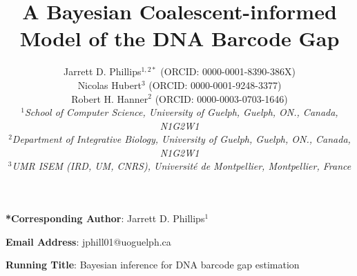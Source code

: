 \documentclass[12pt]{article}
\makeatletter
\renewcommand{\maketitle}{\bgroup\setlength{\parindent}{0pt}
\begin{flushleft}
\textbf{\@title}

  \@author
\end{flushleft}\egroup
}
\makeatother
\begin{document}
\linenumbers

\title{A Bayesian Coalescent-informed Model of the DNA Barcode Gap}

\author{Jarrett D. Phillips$^{1, 2*}$ (ORCID: 0000-0001-8390-386X) \\ Nicolas Hubert$^3$ (ORCID: 0000-0001-9248-3377) \\ Robert H. Hanner$^{2}$ (ORCID: 0000-0003-0703-1646) \\
\textit{$^1$School of Computer Science, University of Guelph, Guelph, ON., Canada, N1G2W1} \\ \textit{$^2$Department of Integrative Biology, University of Guelph, Guelph, ON., Canada, N1G2W1} \\ \textit{$^3$UMR ISEM (IRD, UM, CNRS), Universit{\'e} de Montpellier, Montpellier, France}}

\date{}

\maketitle

\vspace{2mm}

\noindent \textbf{*Corresponding Author}: Jarrett D. Phillips$^{1}$

\noindent \textbf{Email Address}: jphill01@uoguelph.ca

\noindent \textbf{Running Title}: Bayesian inference for DNA barcode gap estimation


\newpage
\end{document}
